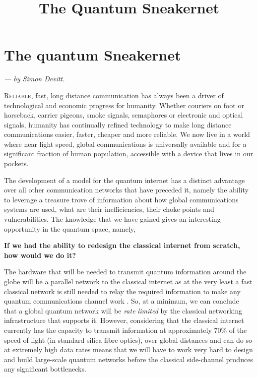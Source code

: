 \documentclass[twocolumn, aps, rmp, amsmath, amssymb, nofootinbib, superscriptaddress, longbibliography, floatfix, table-of-contents, eqsecnum]{revtex4-2}
\newcommand{\sectionby}[1]{\begin{center}\textit{--- by #1.}\end{center}}
\newcommand{\dropcap}[2]{\lettrine[lines=2, findent=3pt, nindent=0pt]{#1}{#2}}
\begin{document}
\title{The Quantum Sneakernet}

\maketitle

\tableofcontents 

\section{The quantum Sneakernet\texttrademark}\label{sec:sneakernet}

\sectionby{Simon Devitt}

\dropcap{R}{eliable}, fast, long distance communication has always been a driver of technological and economic progress for humanity. Whether couriers on foot or horseback, carrier pigeons, smoke signals, semaphores or electronic and optical signals, humanity has continually refined technology to make long distance communications easier, faster, cheaper and more reliable. We now live in a world where near light speed, global communications is universally available and for a significant fraction of human population, accessible with a device that lives in our pockets. 

The development of a model for the quantum internet \cite{?} has a distinct advantage over all other communication networks that have preceded it, namely the ability to leverage a treasure trove of information about how global communications systems are used, what are their inefficiencies, their choke points and vulnerabilities. The knowledge that we have gained gives an interesting opportunity in the quantum space, namely, 

\textbf{If we had the ability to redesign the classical internet from scratch, how would we do it?}

The hardware that will be needed to transmit quantum information around the globe will be a parallel network to the classical internet as at the very least a fast classical network is still needed to relay the required information to make any quantum communications channel work \cite{?}. So, at a minimum, we can conclude that a global quantum network will be \textit{rate limited} by the classical networking infrastructure that supports it. However, considering that the classical internet currently has the capacity to transmit information at approximately 70\% of the speed of light (in standard silica fibre optics), over global distances and can do so at extremely high data rates means that we will have to work very hard to design and build large-scale quantum networks before the classical side-channel produces any significant bottlenecks. 
\end{document}
